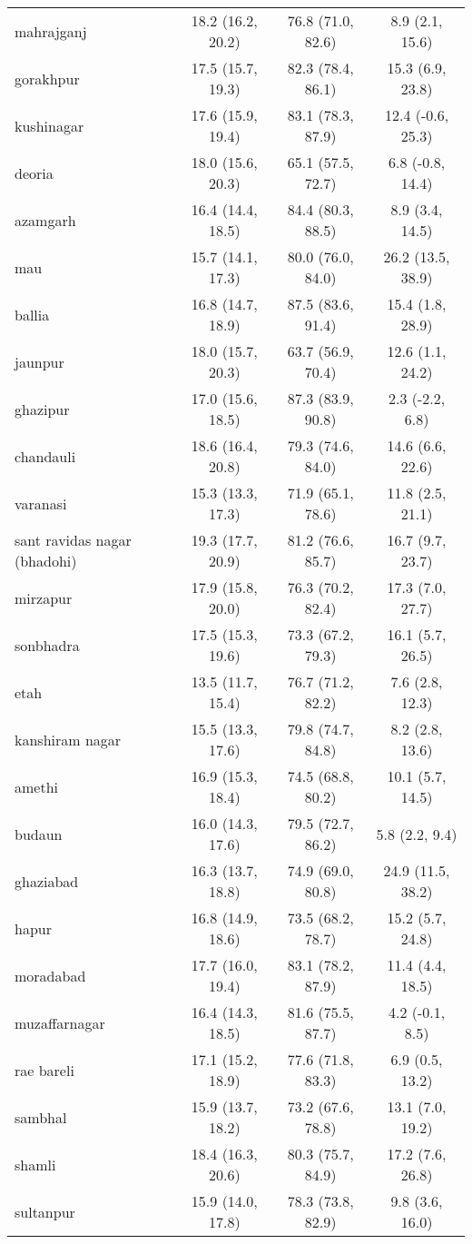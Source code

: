 \begin{tabular}{lccc}
mahrajganj&18.2 (16.2, 20.2)&76.8 (71.0, 82.6)&8.9 (2.1, 15.6)\\
gorakhpur&17.5 (15.7, 19.3)&82.3 (78.4, 86.1)&15.3 (6.9, 23.8)\\
kushinagar&17.6 (15.9, 19.4)&83.1 (78.3, 87.9)&12.4 (-0.6, 25.3)\\
deoria&18.0 (15.6, 20.3)&65.1 (57.5, 72.7)&6.8 (-0.8, 14.4)\\
azamgarh&16.4 (14.4, 18.5)&84.4 (80.3, 88.5)&8.9 (3.4, 14.5)\\
mau&15.7 (14.1, 17.3)&80.0 (76.0, 84.0)&26.2 (13.5, 38.9)\\
ballia&16.8 (14.7, 18.9)&87.5 (83.6, 91.4)&15.4 (1.8, 28.9)\\
jaunpur&18.0 (15.7, 20.3)&63.7 (56.9, 70.4)&12.6 (1.1, 24.2)\\
ghazipur&17.0 (15.6, 18.5)&87.3 (83.9, 90.8)&2.3 (-2.2, 6.8)\\
chandauli&18.6 (16.4, 20.8)&79.3 (74.6, 84.0)&14.6 (6.6, 22.6)\\
varanasi&15.3 (13.3, 17.3)&71.9 (65.1, 78.6)&11.8 (2.5, 21.1)\\
sant ravidas nagar (bhadohi)&19.3 (17.7, 20.9)&81.2 (76.6, 85.7)&16.7 (9.7, 23.7)\\
mirzapur&17.9 (15.8, 20.0)&76.3 (70.2, 82.4)&17.3 (7.0, 27.7)\\
sonbhadra&17.5 (15.3, 19.6)&73.3 (67.2, 79.3)&16.1 (5.7, 26.5)\\
etah&13.5 (11.7, 15.4)&76.7 (71.2, 82.2)&7.6 (2.8, 12.3)\\
kanshiram nagar&15.5 (13.3, 17.6)&79.8 (74.7, 84.8)&8.2 (2.8, 13.6)\\
amethi&16.9 (15.3, 18.4)&74.5 (68.8, 80.2)&10.1 (5.7, 14.5)\\
budaun&16.0 (14.3, 17.6)&79.5 (72.7, 86.2)&5.8 (2.2, 9.4)\\
ghaziabad&16.3 (13.7, 18.8)&74.9 (69.0, 80.8)&24.9 (11.5, 38.2)\\
hapur&16.8 (14.9, 18.6)&73.5 (68.2, 78.7)&15.2 (5.7, 24.8)\\
moradabad&17.7 (16.0, 19.4)&83.1 (78.2, 87.9)&11.4 (4.4, 18.5)\\
muzaffarnagar&16.4 (14.3, 18.5)&81.6 (75.5, 87.7)&4.2 (-0.1, 8.5)\\
rae bareli&17.1 (15.2, 18.9)&77.6 (71.8, 83.3)&6.9 (0.5, 13.2)\\
sambhal&15.9 (13.7, 18.2)&73.2 (67.6, 78.8)&13.1 (7.0, 19.2)\\
shamli&18.4 (16.3, 20.6)&80.3 (75.7, 84.9)&17.2 (7.6, 26.8)\\
sultanpur&15.9 (14.0, 17.8)&78.3 (73.8, 82.9)&9.8 (3.6, 16.0)\\
\bottomrule
\end{tabular}

